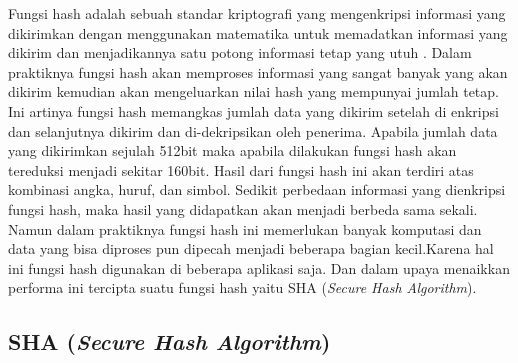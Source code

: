 Fungsi hash adalah sebuah standar kriptografi yang mengenkripsi informasi yang dikirimkan dengan menggunakan matematika untuk memadatkan informasi yang dikirim dan menjadikannya satu potong informasi tetap yang utuh \cite{stallings1999cryptography}. Dalam praktiknya fungsi hash akan memproses informasi yang sangat banyak yang akan dikirim kemudian akan mengeluarkan nilai hash yang mempunyai jumlah tetap. Ini artinya fungsi hash memangkas jumlah data yang dikirim setelah di enkripsi dan selanjutnya dikirim dan di-dekripsikan oleh penerima. Apabila jumlah data yang dikirimkan sejulah 512bit maka apabila dilakukan fungsi hash akan tereduksi menjadi sekitar 160bit. Hasil dari fungsi hash ini akan terdiri atas kombinasi angka, huruf, dan simbol. Sedikit perbedaan informasi yang dienkripsi fungsi hash, maka hasil yang didapatkan akan menjadi berbeda sama sekali. Namun dalam praktiknya fungsi hash ini memerlukan banyak komputasi dan data yang bisa diproses pun dipecah menjadi beberapa bagian kecil.Karena hal ini fungsi hash digunakan di beberapa aplikasi saja. Dan dalam upaya menaikkan performa ini tercipta suatu fungsi hash yaitu SHA (\emph{Secure Hash Algorithm}).

\subsection{SHA (\emph{Secure Hash Algorithm})}
\label{subsec:sha}

